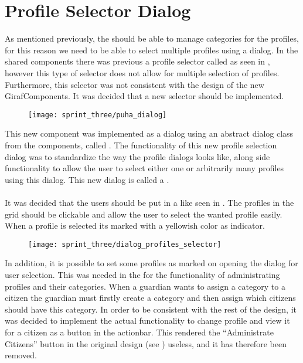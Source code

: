 
\section{Profile Selector Dialog}
\label{sec:profile_selector_dialog}

As mentioned previously, the \ct should be able to manage categories for the profiles, for this reason we need to be able to select multiple profiles using a dialog. In the shared components there was previous a profile selector called  as seen in , however this type of selector does not allow for multiple selection of profiles. Furthermore, this selector was not consistent with the design of the new GirafComponents. It was decided that a new selector should be implemented.

\begin{figure}[!htbp]
        \centering
        \texttt{[image: sprint\_three/puha\_dialog]}
        \caption{}
        \label{fig:puha_dialog}
\end{figure}

This new component was implemented as a dialog using an abstract dialog class from the components, called . The functionality of this new profile selection dialog was to standardize the way the profile dialogs looks like, along side functionality to allow the user to select either one or arbitrarily many profiles using this dialog. This new dialog is called a .
\\\\
It was decided that the users should be put in a  like seen in . The profiles in the grid should be clickable and allow the user to select the wanted profile easily. When a profile is selected its marked with a yellowish color as indicator.

\begin{figure}[!htbp]
        \centering
        \texttt{[image: sprint\_three/dialog\_profiles\_selector]}
        \caption{}
        \label{fig:dialog_profiles_selector}
\end{figure}

In addition, it is possible to set some profiles as marked on opening the dialog for user selection. This was needed in the \ct for the functionality of administrating profiles and their categories. When a guardian wants to assign a category to a citizen the guardian must firstly create a category and then assign which citizens should have this category. In order to be consistent with the rest of the design, it was decided to implement the actual functionality to change profile and view it for a citizen as a button in the actionbar. This rendered the ``Administrate Citizens'' button in the original design (see ) useless, and it has therefore been removed. 